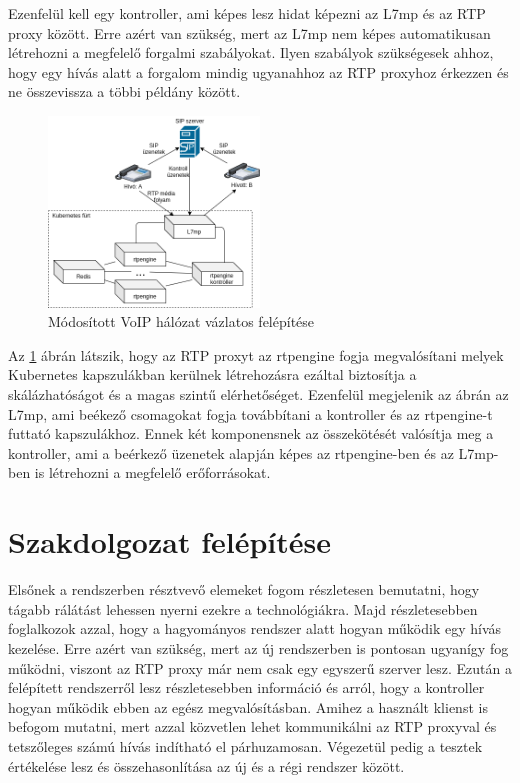 Ezenfelül kell egy kontroller, ami képes lesz hidat képezni az L7mp és az RTP 
proxy között. Erre azért van szükség, mert az L7mp nem képes automatikusan 
létrehozni a megfelelő forgalmi szabályokat. Ilyen szabályok szükségesek ahhoz, 
hogy egy hívás alatt a forgalom mindig ugyanahhoz az RTP proxyhoz érkezzen és 
ne összevissza a többi példány között.  

\begin{figure}[H]
	\centering
	\includegraphics[width=0.5\textwidth, keepaspectratio]{figures/extended_traditional_voip.png}
	\caption{Módosított VoIP hálózat vázlatos felépítése}
	\label{fig:extVoIP}
\end{figure}

Az \ref{fig:extVoIP} ábrán látszik, hogy az RTP proxyt az rtpengine fogja megvalósítani
melyek Kubernetes kapszulákban kerülnek létrehozásra ezáltal biztosítja a skálázhatóságot
és a magas szintű elérhetőséget. Ezenfelül megjelenik az ábrán az L7mp, ami beékező 
csomagokat fogja továbbítani a kontroller és az rtpengine-t futtató kapszulákhoz. Ennek
két komponensnek az összekötését valósítja meg a kontroller, ami a beérkező üzenetek 
alapján képes az rtpengine-ben és az L7mp-ben is létrehozni a megfelelő erőforrásokat.  

\section{Szakdolgozat felépítése}

Elsőnek a rendszerben résztvevő elemeket fogom részletesen bemutatni, hogy 
tágabb rálátást lehessen nyerni ezekre a technológiákra. Majd részletesebben 
foglalkozok azzal, hogy a hagyományos rendszer alatt hogyan működik egy hívás 
kezelése. Erre azért van szükség, mert az új rendszerben is pontosan ugyanígy fog 
működni, viszont az RTP proxy már nem csak egy egyszerű szerver lesz. 
Ezután a felépített rendszerről lesz részletesebben információ és arról, hogy a
kontroller hogyan működik ebben az egész megvalósításban. Amihez a használt
klienst is befogom mutatni, mert azzal közvetlen lehet kommunikálni az RTP proxyval
és tetszőleges számú hívás indítható el párhuzamosan. Végezetül pedig 
a tesztek értékelése lesz és összehasonlítása az új és a régi rendszer között. 